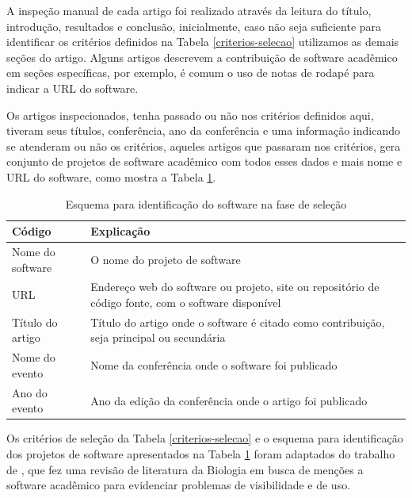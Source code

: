 A inspeção manual de cada artigo foi realizado através da leitura do título,
introdução, resultados e conclusão, inicialmente, caso não seja suficiente para
identificar os critérios definidos na Tabela \ref{criterios-selecao} utilizamos
as demais seções do artigo. Alguns artigos descrevem a contribuição de software
acadêmico em seções específicas, por exemplo, é comum o uso de notas de rodapé
para indicar a URL do software.


Os artigos inspecionados, tenha passado ou não nos critérios definidos aqui,
tiveram seus títulos, conferência, ano da conferência e uma informação
indicando se atenderam ou não os critérios, aqueles artigos que passaram nos
critérios, gera conjunto de projetos de software acadêmico com todos esses
dados e mais nome e URL do software, como mostra a Tabela \ref{esquema-selecao}.

\begin{table}[h]
\caption{Esquema para identificação do software na fase de seleção}
\centering
\begin{tabular}{ l p{11cm} }
  \hline
  Código                   & Explicação \\
  \hline
  Nome do software         & O nome do projeto de software \\
  URL                      & Endereço web do software ou projeto, site ou repositório de código fonte, com o software disponível \\
  Título do artigo         & Título do artigo onde o software é citado como contribuição, seja principal ou secundária \\
  Nome do evento           & Nome da conferência onde o software foi publicado \\
  Ano do evento            & Ano da edição da conferência onde o artigo foi publicado \\
  \hline
\end{tabular}
\label{esquema-selecao}
\end{table}

Os critérios de seleção da Tabela \ref{criterios-selecao} e o esquema para
identificação dos projetos de software apresentados na Tabela
\ref{esquema-selecao} foram adaptados do trabalho de
, que fez uma revisão de literatura da Biologia
em busca de menções a software acadêmico para evidenciar problemas de
visibilidade e de uso.

